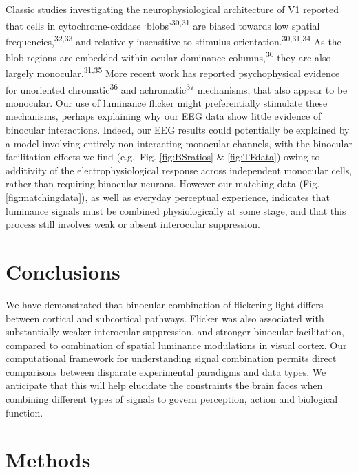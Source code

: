 \documentclass[
]{article}
\begin{document}
Classic studies investigating the neurophysiological architecture of V1 reported that cells in cytochrome-oxidase `blobs'\textsuperscript{30,31} are biased towards low spatial frequencies,\textsuperscript{32,33} and relatively insensitive to stimulus orientation.\textsuperscript{30,31,34} As the blob regions are embedded within ocular dominance columns,\textsuperscript{30} they are also largely monocular.\textsuperscript{31,35} More recent work has reported psychophysical evidence for unoriented chromatic\textsuperscript{36} and achromatic\textsuperscript{37} mechanisms, that also appear to be monocular. Our use of luminance flicker might preferentially stimulate these mechanisms, perhaps explaining why our EEG data show little evidence of binocular interactions. Indeed, our EEG results could potentially be explained by a model involving entirely non-interacting monocular channels, with the binocular facilitation effects we find (e.g.~Fig. \ref{fig:BSratios} \& \ref{fig:TFdata}) owing to additivity of the electrophysiological response across independent monocular cells, rather than requiring binocular neurons. However our matching data (Fig. \ref{fig:matchingdata}), as well as everyday perceptual experience, indicates that luminance signals must be combined physiologically at some stage, and that this process still involves weak or absent interocular suppression.

\hypertarget{conclusions}{%
\section{Conclusions}\label{conclusions}}

We have demonstrated that binocular combination of flickering light differs between cortical and subcortical pathways. Flicker was also associated with substantially weaker interocular suppression, and stronger binocular facilitation, compared to combination of spatial luminance modulations in visual cortex. Our computational framework for understanding signal combination permits direct comparisons between disparate experimental paradigms and data types. We anticipate that this will help elucidate the constraints the brain faces when combining different types of signals to govern perception, action and biological function.

\hypertarget{methods}{%
\section{Methods}\label{methods}}
\end{document}
